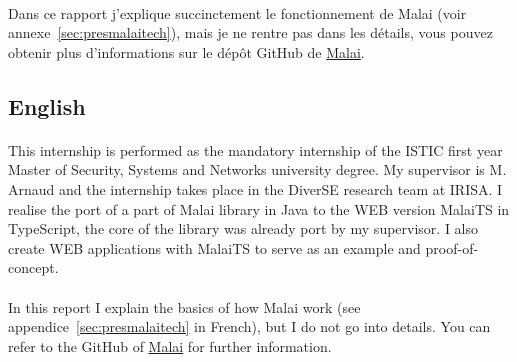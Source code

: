 \documentclass[11pt, a4paper, pdftex]{article}
\begin{document}
            \paragraph{}
                Dans ce rapport j'explique succinctement le fonctionnement de Malai (voir annexe~\ref{sec:presmalaitech}), mais je ne rentre pas dans les détails, vous pouvez obtenir plus d'informations sur le dépôt GitHub de \href{https://github.com/arnobl/Malai}{Malai}.

        \subsection{English}\label{subsec:eng}
            \paragraph{}
                This internship is performed as the mandatory internship of the ISTIC first year Master of Security, Systems and Networks university degree.
                My supervisor is M. Arnaud  and the internship takes place in the DiverSE research team at IRISA\@.
                I realise the port of a part of Malai library in Java to the WEB version MalaiTS in TypeScript, the core of the library was already port by my supervisor.
                I also create WEB applications with MalaiTS to serve as an example and proof-of-concept.

            \paragraph{}
                In this report I explain the basics of how Malai work (see appendice~\ref{sec:presmalaitech} in French), but I do not go into details. You can refer to the GitHub of \href{https://github.com/arnobl/Malai}{Malai} for further information.

    \newpage

\end{document}
